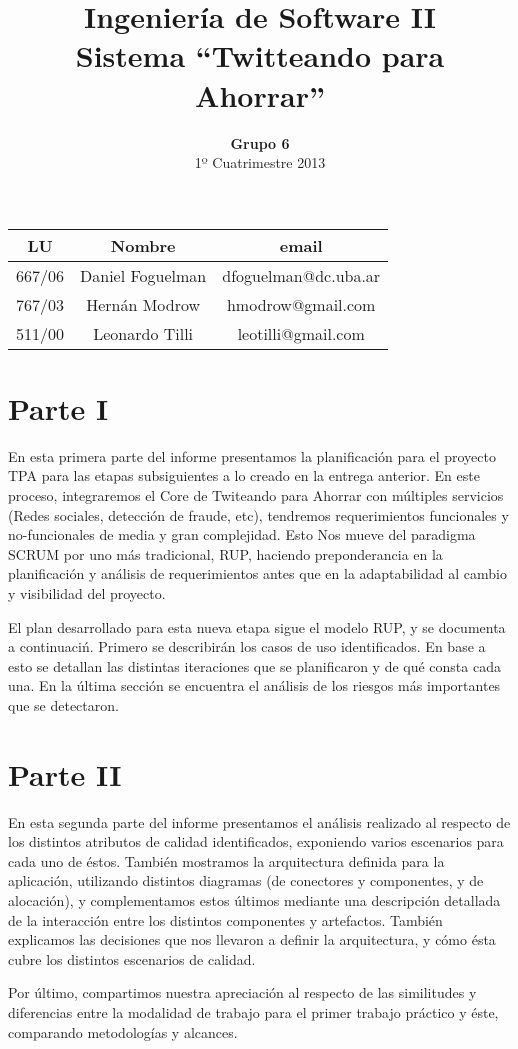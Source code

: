 \documentclass[a4paper,spanish]{article}
\title{Ingenier\'ia de Software II\\ \textbf{Sistema ``Twitteando para Ahorrar''}}
\author{\textbf{Grupo 6}\\ 1º Cuatrimestre 2013}
\date{}
\begin{document}
\maketitle
\vspace{10cm}
\begin{center}

\begin{tabular}{|c|c|c|}
\hline
\hline
\textbf{LU}&\textbf{Nombre}&\textbf{email}\\
\hline
667/06&Daniel Foguelman &dfoguelman@dc.uba.ar\\
\hline
767/03&Hern\'an Modrow&hmodrow@gmail.com\\
\hline
511/00&Leonardo Tilli&leotilli@gmail.com\\
\hline
\hline
\end{tabular}
\end{center}
\newpage

\section{Parte I}

 En esta primera parte del informe presentamos la planificaci\'on para el proyecto TPA para las etapas subsiguientes a lo creado en la entrega anterior. En este proceso, integraremos el Core de Twiteando para Ahorrar con m\'ultiples servicios (Redes sociales, detecci\'on de fraude, etc), tendremos requerimientos funcionales y no-funcionales de media y gran complejidad. Esto Nos mueve del paradigma SCRUM por uno m\'as tradicional, RUP, haciendo preponderancia en la planificaci\'on y an\'alisis de requerimientos antes que en la adaptabilidad al cambio y visibilidad del proyecto.

 El plan desarrollado para esta nueva etapa sigue el modelo RUP, y se documenta a continuaci\'n. Primero se describir\'an los casos de uso identificados. En base a esto se detallan las distintas iteraciones que se planificaron y de qu\'e consta cada una. En la \'ultima secci\'on se encuentra el an\'alisis de los riesgos m\'as importantes que se detectaron.






\section{Parte II}

 En esta segunda parte del informe presentamos el an\'alisis realizado al respecto de los distintos atributos de calidad identificados, exponiendo varios escenarios para cada uno de \'estos. Tambi\'en mostramos la arquitectura definida para la aplicaci\'on, utilizando distintos diagramas (de conectores y componentes, y de alocaci\'on), y complementamos estos \'ultimos mediante una descripci\'on detallada de la interacci\'on entre los distintos componentes y artefactos. Tambi\'en explicamos las decisiones que nos llevaron a definir la arquitectura, y c\'omo \'esta cubre los distintos escenarios de calidad.
 
 Por \'ultimo, compartimos nuestra apreciaci\'on al respecto de las similitudes y diferencias entre la modalidad de trabajo para el primer trabajo pr\'actico y \'este, comparando metodolog\'ias y alcances.
 




\end{document}
